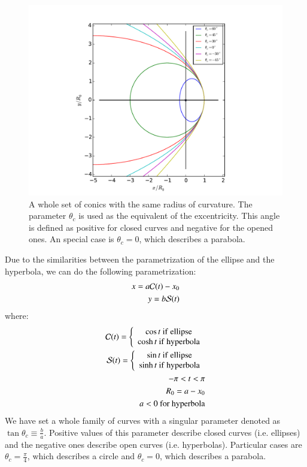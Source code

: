 \begin{figure}
\includegraphics[width=\linewidth]{conic1}
\caption{A whole set of conics with the same radius of curvature. The parameter $\theta_c$ is used as the equivalent of the excentricity. This angle is defined as positive for closed curves
and negative for the opened ones. An special case is $\theta_c=0$, which describes a parabola.}
\label{fig:conics-family}
\end{figure}

Due to the similarities between the parametrization of the ellipse and the hyperbola, we can do the following parametrization:
\begin{align}
x = a\mathcal{C}(t)-x_0 \label{eq:par-x}\\ 
y = b\mathcal{S}(t) \label{eq:par-y}
\end{align}
where:
\begin{align}
\mathcal{C}(t) = \left\lbrace \begin{array}{c}
\cos t ~\mathrm{if~ellipse} \\
\cosh t ~\mathrm{if~hyperbola}
\end{array}\right.\\
\mathcal{S}(t) = \left\lbrace \begin{array}{c}
\sin t ~\mathrm{if~ellipse} \\
\sinh t ~\mathrm{if~hyperbola}
\end{array}\right. \\
-\pi < t < \pi \\
R_0 = a - x_0 \\
a<0 ~ \mathrm{for~hyperbola}
\end{align}
We have set a whole family of curves with a singular parameter denoted as $\tan\theta_c \equiv \frac{b}{a}$. Positive values of this parameter describe closed curves
(i.e. ellipses) and the negative ones describe open curves (i.e. hyperbolas). Particular cases are $\theta_c =\frac{\pi}{4}$, which describes a circle and $\theta_c=0$, which describes
a parabola.

